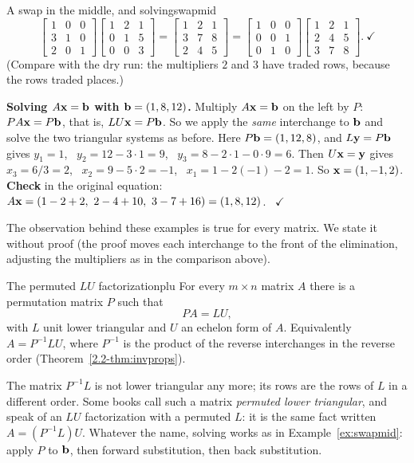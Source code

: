 \documentclass[11pt]{article}
\begin{document}
\begin{exmp}{A swap in the middle, and solving}{swapmid}
\[\begin{bmatrix}1&0&0\\3&1&0\\2&0&1\end{bmatrix}\begin{bmatrix}1&2&1\\0&1&5\\0&0&3\end{bmatrix}=\begin{bmatrix}1&2&1\\3&7&8\\2&4&5\end{bmatrix}=\begin{bmatrix}1&0&0\\0&0&1\\0&1&0\end{bmatrix}\begin{bmatrix}1&2&1\\2&4&5\\3&7&8\end{bmatrix}.\ \checkmark
\]
(Compare with the dry run: the multipliers $2$ and $3$ have traded rows, because the rows traded places.)

\textbf{Solving $A\mathbf{x}=\mathbf{b}$ with $\mathbf{b}=(1,8,12)$.} Multiply $A\mathbf{x}=\mathbf{b}$ on the left by $P$: $PA\mathbf{x}=P\mathbf{b}$, that is, $LU\mathbf{x}=P\mathbf{b}$. So we apply the \emph{same} interchange to $\mathbf{b}$ and solve the two triangular systems as before. Here $P\mathbf{b}=(1,12,8)$, and $L\mathbf{y}=P\mathbf{b}$ gives $y_1=1$, \ $y_2=12-3\cdot1=9$, \ $y_3=8-2\cdot1-0\cdot9=6$. Then $U\mathbf{x}=\mathbf{y}$ gives $x_3=6/3=2$, \ $x_2=9-5\cdot2=-1$, \ $x_1=1-2(-1)-2=1$. So $\mathbf{x}=(1,-1,2)$. \textbf{Check} in the original equation: $A\mathbf{x}=(1-2+2,\ 2-4+10,\ 3-7+16)=(1,8,12)$. \ $\checkmark$
\end{exmp}

The observation behind these examples is true for every matrix. We state it without proof (the proof moves each interchange to the front of the elimination, adjusting the multipliers as in the comparison above).

\begin{thm}{The permuted $LU$ factorization}{plu}
For every $m\times n$ matrix $A$ there is a permutation matrix $P$ such that
\[
PA=LU,
\]
with $L$ unit lower triangular and $U$ an echelon form of $A$. Equivalently $A=P^{-1}LU$, where $P^{-1}$ is the product of the reverse interchanges in the reverse order (Theorem~\ref{2.2-thm:invprops}).
\end{thm}

The matrix $P^{-1}L$ is not lower triangular any more; its rows are the rows of $L$ in a different order. Some books call such a matrix \emph{permuted lower triangular}, and speak of an $LU$ factorization with a permuted $L$: it is the same fact written $A=(P^{-1}L)U$. Whatever the name, solving works as in Example~\ref{ex:swapmid}: apply $P$ to $\mathbf{b}$, then forward substitution, then back substitution.
\end{document}
